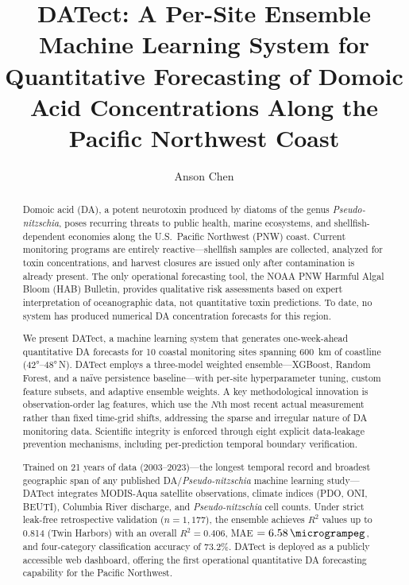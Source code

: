 \documentclass[preprint,12pt,authoryear]{elsarticle}
\begin{document}
\begin{frontmatter}

\title{DATect: A Per-Site Ensemble Machine Learning System for Quantitative Forecasting of Domoic Acid Concentrations Along the Pacific Northwest Coast}

\author[uw]{Anson Chen}

\address[uw]{University of Washington, Seattle, WA 98195, United States}

\begin{abstract}
Domoic acid (DA), a potent neurotoxin produced by diatoms of the genus \textit{Pseudo-nitzschia}, poses recurring threats to public health, marine ecosystems, and shellfish-dependent economies along the U.S.\ Pacific Northwest (PNW) coast. Current monitoring programs are entirely reactive---shellfish samples are collected, analyzed for toxin concentrations, and harvest closures are issued only after contamination is already present. The only operational forecasting tool, the NOAA PNW Harmful Algal Bloom (HAB) Bulletin, provides qualitative risk assessments based on expert interpretation of oceanographic data, not quantitative toxin predictions. To date, no system has produced numerical DA concentration forecasts for this region.

We present DATect, a machine learning system that generates one-week-ahead quantitative DA forecasts for 10 coastal monitoring sites spanning \SI{600}{\kilo\meter} of coastline (\ang{42}--\ang{48}\,N). DATect employs a three-model weighted ensemble---XGBoost, Random Forest, and a na\"ive persistence baseline---with per-site hyperparameter tuning, custom feature subsets, and adaptive ensemble weights. A key methodological innovation is observation-order lag features, which use the $N$th most recent actual measurement rather than fixed time-grid shifts, addressing the sparse and irregular nature of DA monitoring data. Scientific integrity is enforced through eight explicit data-leakage prevention mechanisms, including per-prediction temporal boundary verification.

Trained on 21 years of data (2003--2023)---the longest temporal record and broadest geographic span of any published DA/\textit{Pseudo-nitzschia} machine learning study---DATect integrates MODIS-Aqua satellite observations, climate indices (PDO, ONI, BEUTI), Columbia River discharge, and \textit{Pseudo-nitzschia} cell counts. Under strict leak-free retrospective validation ($n = 1{,}177$), the ensemble achieves $R^2$ values up to 0.814 (Twin Harbors) with an overall $R^2 = 0.406$, MAE $= \SI{6.58}{\microgrampeg}$, and four-category classification accuracy of 73.2\%. DATect is deployed as a publicly accessible web dashboard, offering the first operational quantitative DA forecasting capability for the Pacific Northwest.
\end{abstract}


\end{frontmatter}
\end{document}
